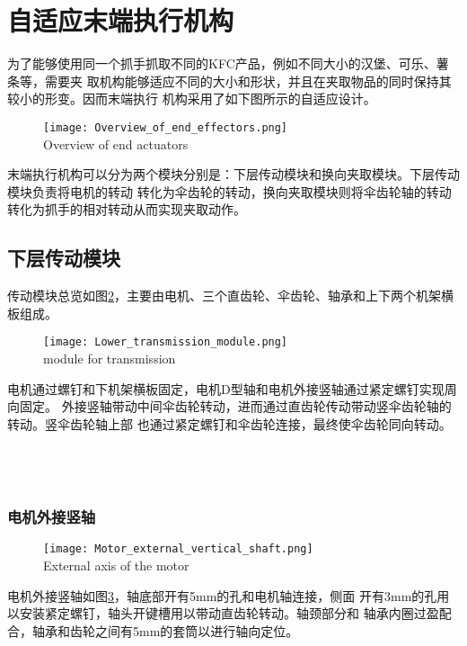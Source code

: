 
\section{自适应末端执行机构}

为了能够使用同一个抓手抓取不同的KFC产品，例如不同大小的汉堡、可乐、薯条等，需要夹
取机构能够适应不同的大小和形状，并且在夹取物品的同时保持其较小的形变。因而末端执行
机构采用了如下图所示的自适应设计。

\begin{figure}[!htp]
  \centering
  \texttt{[image: Overview\_of\_end\_effectors.png]} \\
    {Overview of end actuators}
  \label{fig:末端执行机构总览}
\end{figure}

末端执行机构可以分为两个模块分别是：下层传动模块和换向夹取模块。下层传动模块负责将电机的转动
转化为伞齿轮的转动，换向夹取模块则将伞齿轮轴的转动转化为抓手的相对转动从而实现夹取动作。



\subsection{下层传动模块}

传动模块总览如图\ref{fig:下部传动模块}，主要由电机、三个直齿轮、伞齿轮、轴承和上下两个机架横板组成。

\begin{figure}[!htp]
  \centering
  \texttt{[image: Lower\_transmission\_module.png]} \\
    {module for transmission}
  \label{fig:下部传动模块}
\end{figure}

电机通过螺钉和下机架横板固定，电机D型轴和电机外接竖轴通过紧定螺钉实现周向固定。
外接竖轴带动中间伞齿轮转动，进而通过直齿轮传动带动竖伞齿轮轴的转动。竖伞齿轮轴上部
也通过紧定螺钉和伞齿轮连接，最终使伞齿轮同向转动。
\\
\\ 
\\
\\

\subsubsection{电机外接竖轴}


\begin{figure}[!htp]
  \centering
  \texttt{[image: Motor\_external\_vertical\_shaft.png]} \\
    {External axis of the motor}
  \label{fig:电机外接竖轴}
\end{figure}
电机外接竖轴如图\ref{fig:电机外接竖轴}，轴底部开有5mm的孔和电机轴连接，侧面
开有3mm的孔用以安装紧定螺钉，轴头开键槽用以带动直齿轮转动。轴颈部分和
轴承内圈过盈配合，轴承和齿轮之间有5mm的套筒以进行轴向定位。


